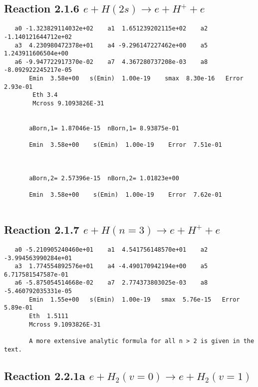 \documentclass[12pt,dvipdfm]{article}
\begin{document}
\newpage
\subsection{
Reaction 2.1.6 $   e + H(2s) \rightarrow e + H^+ + e$}



\begin{small}\begin{verbatim}
   a0 -1.323829114032e+02    a1  1.651239202115e+02    a2 -1.140121644712e+02
   a3  4.230980472378e+01    a4 -9.296147227462e+00    a5  1.243911606504e+00
   a6 -9.947722917370e-02    a7  4.367280737208e-03    a8 -8.092922245217e-05
       Emin  3.58e+00   s(Emin)  1.00e-19    smax  8.30e-16   Error  2.93e-01
        Eth 3.4
        Mcross 9.1093826E-31


       aBorn,1= 1.87046e-15  nBorn,1= 8.93875e-01

       Emin  3.58e+00    s(Emin)  1.00e-19    Error  7.51e-01



       aBorn,2= 2.57396e-15  nBorn,2= 1.01823e+00

       Emin  3.58e+00    s(Emin)  1.00e-19    Error  7.62e-01


\end{verbatim}\end{small}




\newpage
\subsection{
Reaction 2.1.7 $   e + H(n=3) \rightarrow e + H^+ + e$}



\begin{small}\begin{verbatim}
   a0 -5.210905240460e+01    a1  4.541756148570e+01    a2 -3.994563990284e+01
   a3  1.774554892576e+01    a4 -4.490170942194e+00    a5  6.717581547587e-01
   a6 -5.875054514668e-02    a7  2.774373803025e-03    a8 -5.460792035331e-05
       Emin  1.55e+00   s(Emin)  1.00e-19   smax  5.76e-15   Error  5.89e-01
       Eth  1.5111
       Mcross 9.1093826E-31

       A more extensive analytic formula for all n > 2 is given in the text.
\end{verbatim}\end{small}




\newpage
\subsection{
Reaction 2.2.1a $   e + H_2(v=0) \rightarrow e + H_2(v=1)$}
\end{document}
